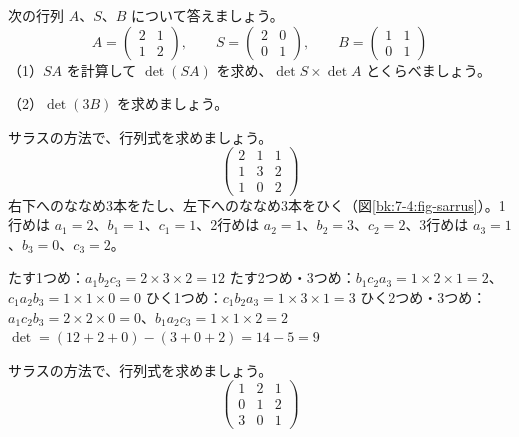 \begin{jibun}
次の行列 $A$、$S$、$B$ について答えましょう。
\[ A=\begin{pmatrix}2&1\\1&2\end{pmatrix},\qquad S=\begin{pmatrix}2&0\\0&1\end{pmatrix},\qquad B=\begin{pmatrix}1&1\\0&1\end{pmatrix} \]
（1）$SA$ を計算して $\det(SA)$ を求め、$\det S\times\det A$ とくらべましょう。\par
（2）$\det(3B)$ を求めましょう。
\end{jibun}

\begin{reidai}[3×3 の行列式]
サラスの方法で、行列式を求めましょう。
\[ \begin{pmatrix}2&1&1\\1&3&2\\1&0&2\end{pmatrix} \]
\kangaekata 右下へのななめ3本をたし、左下へのななめ3本をひく（図\ref{bk:7-4:fig-sarrus}）。1行めは $a_1=2$、$b_1=1$、$c_1=1$、2行めは $a_2=1$、$b_2=3$、$c_2=2$、3行めは $a_3=1$、$b_3=0$、$c_3=2$。\par
\shiki たす1つめ：$a_1b_2c_3=2\times3\times2=12$\kviieq
たす2つめ・3つめ：$b_1c_2a_3=1\times2\times1=2$、$c_1a_2b_3=1\times1\times0=0$\kviieq
ひく1つめ：$c_1b_2a_3=1\times3\times1=3$\kviieq
ひく2つめ・3つめ：$a_1c_2b_3=2\times2\times0=0$、$b_1a_2c_3=1\times1\times2=2$\kviieq
$\det=(12+2+0)-(3+0+2)=14-5=9$\par
{}
\end{reidai}

\begin{jibun}
サラスの方法で、行列式を求めましょう。
\[ \begin{pmatrix}1&2&1\\0&1&2\\3&0&1\end{pmatrix} \]
\end{jibun}

